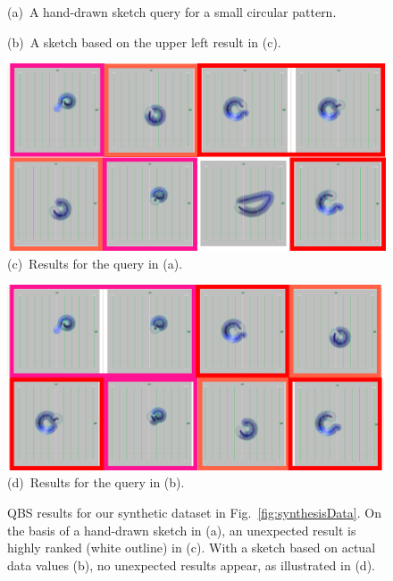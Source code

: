 \begin{figure}[tb]
\begin{minipage}{0.49\linewidth}
    \end{minipage}
    \begin{minipage}{0.49\linewidth}
        \centering
        \footnotesize{\sf (a)~A hand-drawn sketch query for a small circular pattern.}
    \end{minipage}
    \begin{minipage}{0.49\linewidth}
        \centering
        \footnotesize{\sf (b)~A sketch based on the upper left result in (c). 
        }
    \end{minipage}
    \begin{minipage}{0.49\linewidth}
        \centering
        \includegraphics[width=.99\linewidth]{figures/QBSResultsHanddrawn_revised.png}\\
        \footnotesize{\sf (c)~Results for the query in (a).}
    \end{minipage}
    \begin{minipage}{0.49\linewidth}
        \centering
        \includegraphics[width=.99\linewidth]{figures/QBSResultsResultQuery_revised.png}\\
        \footnotesize{\sf (d)~Results for the query in (b).}
    \end{minipage}
    \caption{QBS results for our synthetic dataset in Fig.~\ref{fig:synthesisData}.
        On the basis of a hand-drawn sketch in (a), an unexpected result is highly ranked (white outline) in (c). 
        With a sketch based on actual data values (b), no unexpected results appear, as illustrated in (d).
        }
    \label{fig:QBSDemodata}
\end{figure}
